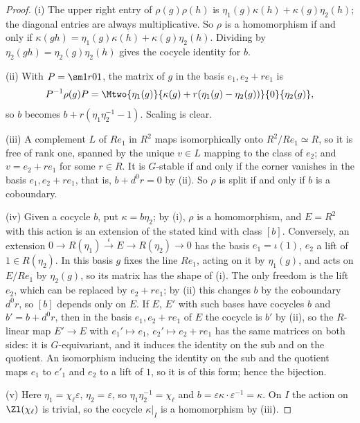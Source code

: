 \begin{proof}
(i) The upper right entry of $\rho(g)\rho(h)$ is $\eta_1(g)\kappa(h)+\kappa(g)\eta_2(h)$; the diagonal entries are always multiplicative. So $\rho$ is a
homomorphism if and only if $\kappa(gh)=\eta_1(g)\kappa(h)+\kappa(g)\eta_2(h)$. Dividing by $\eta_2(gh)=\eta_2(g)\eta_2(h)$ gives the cocycle identity for $b$.

(ii) With $P=\sm1r01$, the matrix of $g$ in the basis $e_1,e_2+re_1$ is
\[
P^{-1}\rho(g)P=\Mtwo{\eta_1(g)}{\kappa(g)+r(\eta_1(g)-\eta_2(g))}{0}{\eta_2(g)},
\]
so $b$ becomes $b+r(\eta_1\eta_2^{-1}-1)$. Scaling is clear.

(iii) A complement $L$ of $Re_1$ in $R^2$ maps isomorphically onto $R^2/Re_1\simeq R$, so it is free of rank one, spanned by the unique $v\in L$ mapping to
the class of $e_2$; and $v=e_2+re_1$ for some $r\in R$. It is $G$-stable if and only if the corner vanishes in the basis $e_1,e_2+re_1$, that is, $b+d^0r=0$ by
(ii). So $\rho$ is split if and only if $b$ is a coboundary.

(iv) Given a cocycle $b$, put $\kappa=b\eta_2$; by (i), $\rho$ is a homomorphism, and $E=R^2$ with this action is an extension of the stated kind with class $[b]$.
Conversely, an extension $0\to R(\eta_1)\xrightarrow{\iota}E\to R(\eta_2)\to0$ has the basis $e_1=\iota(1)$, $e_2$ a lift of $1\in R(\eta_2)$. In this basis
$g$ fixes the line $Re_1$, acting on it by $\eta_1(g)$, and acts on $E/Re_1$ by $\eta_2(g)$, so its matrix has the shape of (i). The only freedom is the lift $e_2$,
which can be replaced by $e_2+re_1$; by (ii) this changes $b$ by the coboundary $d^0r$, so $[b]$ depends only on $E$. If $E$, $E'$ with such bases have cocycles
$b$ and $b'=b+d^0r$, then in the basis $e_1,e_2+re_1$ of $E$ the cocycle is $b'$ by (ii), so the $R$-linear map $E'\to E$ with $e_1'\mapsto e_1$, $e_2'\mapsto e_2+re_1$
has the same matrices on both sides: it is $G$-equivariant, and it induces the identity on the sub and on the quotient. An isomorphism inducing the identity on
the sub and the quotient maps $e_1$ to $e'_1$ and $e_2$ to a lift of $1$, so it is of this form; hence the bijection.

(v) Here $\eta_1=\chi_\ell\varepsilon$, $\eta_2=\varepsilon$, so $\eta_1\eta_2^{-1}=\chi_\ell$ and $b=\varepsilon\kappa\cdot\varepsilon^{-1}=\kappa$. On $I$ the action on $\Zl(\chi_\ell)$ is
trivial, so the cocycle $\kappa|_I$ is a homomorphism by (iii).
\end{proof}

